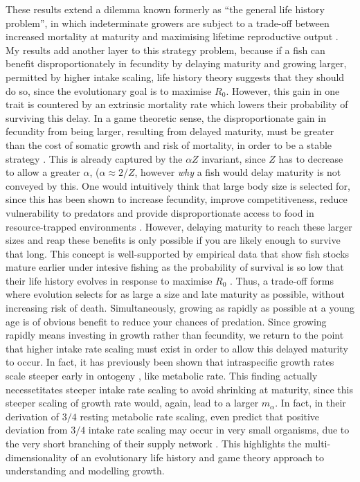 \documentclass[a4paper]{article} %
\begin{document}
These results extend a dilemma known formerly as ``the general life history problem'', in which indeterminate growers are subject to a trade-off between increased mortality at maturity and maximising lifetime reproductive output \autocite{Roff1984, Roff2006, Stearns2000}. My results add another layer to this strategy problem, because if a fish can benefit disproportionately in fecundity by delaying maturity and growing larger, permitted by higher intake scaling, life history theory suggests that they should do so, since the evolutionary goal is to maximise $R_0$. However, this gain in one trait is countered by an extrinsic mortality rate which lowers their probability of surviving this delay. In a game theoretic sense, the disproportionate gain in fecundity from being larger, resulting from delayed maturity, must be greater than the cost of somatic growth and risk of mortality, in order to be a stable strategy \autocite{Arendt2011, Enberg2012}. This is already captured by the $\alpha Z$ invariant, since $Z$ has to decrease to allow a greater $\alpha$, ($\alpha \approx 2/Z$, however \textit{why} a fish would delay maturity is not conveyed by this. One would intuitively think that large body size is selected for, since this has been shown to increase fecundity, improve competitiveness, reduce vulnerability to predators and provide disproportionate access to food in resource-trapped environments \autocite{roff2002life, Oddie2000, French2005, Bashey2008, Magnhagen2001, Craig2006, Arendt2011, Pawar2012}. However, delaying maturity to reach these larger sizes and reap these benefits is only possible if you are likely enough to survive that long. This concept is well-supported by empirical data that show fish stocks mature earlier under intesive fishing as the probability of survival is so low that their life history evolves in response to maximise $R_0$ \autocite{Rowell1993, Rochet2001, Swain2011}. Thus, a trade-off forms where evolution selects for as large a size and late maturity as possible, without increasing risk of death. Simultaneously, growing as rapidly as possible at a young age is of obvious benefit to reduce your chances of predation. Since growing rapidly means investing in growth rather than fecundity, we return to the point that higher intake rate scaling must exist in order to allow this delayed maturity to occur. In fact, it has previously been shown that intraspecific growth rates scale steeper early in ontogeny \autocite{Barneche2018c}, like metabolic rate. This finding actually necessetitates steeper intake rate scaling to avoid shrinking at maturity, since this steeper scaling of growth rate would, again, lead to a larger $m_{\alpha}$. In fact, in their derivation of $3/4$ resting metabolic rate scaling, \textcite{West1997} even predict that positive deviation from $3/4$ intake rate scaling may occur in very small organisms, due to the very short branching of their supply network \autocite{Barneche2018c}. This highlights the multi-dimensionality of an evolutionary life history and game theory approach to understanding and modelling growth. 
\end{document}

